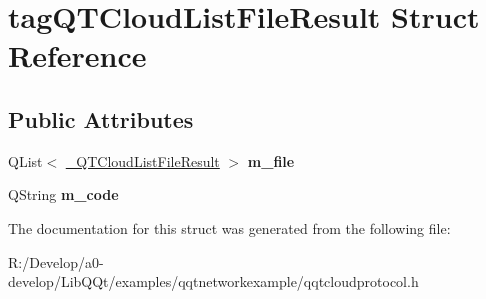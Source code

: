 \hypertarget{structtag_q_t_cloud_list_file_result}{}\section{tag\+Q\+T\+Cloud\+List\+File\+Result Struct Reference}
\label{structtag_q_t_cloud_list_file_result}
\subsection*{Public Attributes}
\begin{DoxyCompactItemize}
\item 
\mbox{\label{structtag_q_t_cloud_list_file_result_a173534b93b8ba108c2f3d62f39530f94}} 
Q\+List$<$ \mbox{\hyperlink{structtag___q_t_cloud_list_file_result}{\+\_\+\+Q\+T\+Cloud\+List\+File\+Result}} $>$ {\bfseries m\+\_\+file}
\item 
\mbox{\label{structtag_q_t_cloud_list_file_result_af3cc51cdd6adda69545e170869cb80d2}} 
Q\+String {\bfseries m\+\_\+code}
\end{DoxyCompactItemize}


The documentation for this struct was generated from the following file\+:\begin{DoxyCompactItemize}
\item 
R\+:/\+Develop/a0-\/develop/\+Lib\+Q\+Qt/examples/qqtnetworkexample/qqtcloudprotocol.\+h\end{DoxyCompactItemize}
